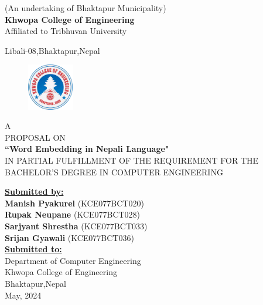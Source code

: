 \begin{center}
	\thispagestyle{empty}
	 \normalsize(An undertaking of Bhaktapur Municipality)\\
	 \Large\textbf{Khwopa College of Engineering}\\
	 \normalsize Affiliated to Tribhuvan University\\
	\normalsize{{{Libali-08,Bhaktapur,Nepal}}\\[0.75cm]

	\begin{figure}[h!]
		\centering
			\includegraphics[width=0.18\textwidth]{img/khwopa logo hd.png}
	\end{figure}
	\large{A \\PROPOSAL ON\\\textbf{``Word Embedding in Nepali Language"}}\\\vspace{0.1in}
	 \normalsize{IN PARTIAL FULFILLMENT OF THE REQUIREMENT
FOR THE BACHELOR’S DEGREE IN COMPUTER ENGINEERING} \\[0.65cm]
 
\vspace*{1cm}
	
	\large\textbf{\underline{Submitted by:}}\\
	
{\bf Manish Pyakurel} (KCE077BCT020)\\
{\bf Rupak Neupane} (KCE077BCT028)\\
{\bf Sarjyant Shrestha} (KCE077BCT033)\\
{\bf Srijan Gyawali} (KCE077BCT036)\\[0.75cm]

	\large\textbf{\underline{Submitted to:}}\\

\large Department of Computer Engineering\\
\large Khwopa College of Engineering\\
\large Bhaktapur,Nepal\\[0.75cm]
\large{May, 2024}
}
\end{center}